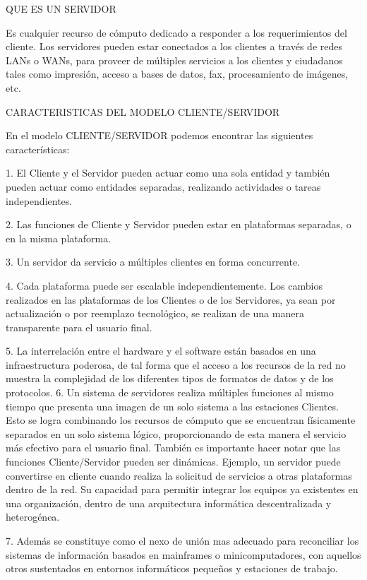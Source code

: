 QUE ES UN SERVIDOR

Es cualquier recurso de cómputo dedicado a responder a los requerimientos del cliente. Los servidores pueden estar conectados a 
los clientes a través de redes LANs o WANs, para proveer de múltiples servicios a los clientes y ciudadanos tales como impresión, 
acceso a bases de datos, fax, procesamiento de imágenes, etc.

CARACTERISTICAS DEL MODELO CLIENTE/SERVIDOR

En el modelo CLIENTE/SERVIDOR podemos encontrar las siguientes características:

1. El Cliente y el Servidor pueden actuar como una sola entidad y también pueden actuar como entidades separadas, realizando 
actividades o tareas independientes.

2. Las funciones de Cliente y Servidor pueden estar en plataformas separadas, o en la misma plataforma.

3. Un servidor da servicio a múltiples clientes en forma concurrente.

4. Cada plataforma puede ser escalable independientemente. Los cambios realizados en las plataformas de los Clientes o de 
los Servidores, ya sean por actualización o por reemplazo tecnológico, se realizan de una manera transparente para el usuario final.

5. La interrelación entre el hardware y el software están basados en una infraestructura poderosa, de tal forma que el acceso a
los recursos de la red no muestra la complejidad de los diferentes tipos de formatos de datos y de los protocolos.
6. Un sistema de servidores realiza múltiples funciones al mismo tiempo que presenta una imagen de un solo sistema a las estaciones 
Clientes. Esto se logra combinando los recursos de cómputo que se encuentran físicamente separados en un solo sistema lógico, 
proporcionando de esta manera el servicio más efectivo para el usuario final.
También es importante hacer notar que las funciones Cliente/Servidor pueden ser dinámicas. Ejemplo, un servidor puede convertirse en 
cliente cuando realiza la solicitud de servicios a otras plataformas dentro de la red.
Su capacidad para permitir integrar los equipos ya existentes en una organización, dentro de una arquitectura informática 
descentralizada y heterogénea.

7. Además se constituye como el nexo de unión mas adecuado para reconciliar los sistemas de información basados en mainframes 
o minicomputadores, con aquellos otros sustentados en entornos informáticos pequeños y estaciones de trabajo.

